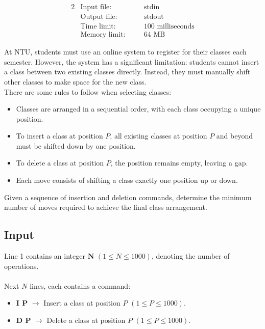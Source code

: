 \documentclass[12pt,a4paper]{article}
\begin{document}
\begin{alignat*} {2}
 &   \text{Input file:}   \quad     &&\text{stdin}\\
 &   \text{Output file:}  \quad     &&\text{stdout}\\
 &   \text{Time limit:}   \quad     &&\text{100 milliseconds}\\
 &   \text{Memory limit:} \quad     &&\text{64 MB}
\end{alignat*}

\noindent
At NTU, students must use an online system to register for their classes each semester. However, the system has a significant limitation: students cannot insert a class between two existing classes directly. Instead, they must manually shift other classes to make space for the new class.
\\
\noindent
There are some rules to follow when selecting classes:
\begin{itemize}
    \item Classes are arranged in a sequential order, with each class occupying a unique position.
    \item To insert a class at position \textbf{\( P \)}, all existing classes at position \textbf{\( P \)} and beyond must be shifted down by one position.
    \item To delete a class at position \textbf{\( P \)}, the position remains empty, leaving a gap.
    \item Each move consists of shifting a class exactly one position up or down.
\end{itemize}

\noindent
Given a sequence of insertion and deletion commands, determine the minimum number of moves required to achieve the final class arrangement.

\subsection*{\fontsize{16}{12}Input}
Line 1 contains an integer \(\textbf{N}\) \((1 \leq N \leq 1000)\), denoting the number of operations.
\\\\
\noindent
Next \textbf{\( N \)} lines, each contains a command:
    \begin{itemize}
        \item \textbf{I P} $\rightarrow$ Insert a class at position \( P \) \((1 \leq P \leq 1000)\).
        \item \textbf{D P} $\rightarrow$ Delete a class at position \( P \) \((1 \leq P \leq 1000)\).
    \end{itemize}
\end{document}
